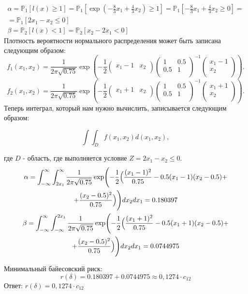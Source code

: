 \documentclass[14pt]{extarticle}
\begin{document}
\begin{gather*}
\alpha=\mathbb{P}_1\left[l\left(x\right) \geqslant 1\right]=\mathbb{P}_1\left[\exp \left(-\frac{8}{3}x_1+\frac{4}{3}x_2 \right) \geqslant 1\right]=\mathbb{P}_1\left[-\frac{8}{3}x_1+\frac{4}{3}x_2 \geqslant 0\right]=\\
=\mathbb{P}_1\left[2x_1 - x_2 \leqslant 0\right] \\
\beta=\mathbb{P}_2[l(x)<1]=\mathbb{P}_2[x_2-2x_1<0]
\end{gather*}
Плотность вероятности нормального распределения может быть записана следующим образом:
$$
f_1(x_1, x_2) = \frac{1}{2\pi\sqrt{0.75}} \exp{\left(-\frac{1}{2}\left(\begin{array}{cc}x_1 - 1 & x_2\\ \end{array}\right)\left(\begin{array}{cc}1 & 0.5\\ 0.5 & 1\\ \end{array}\right)^{-1}\left(\begin{array}{c}x_1 - 1\\ x_2\\ \end{array}\right)\right)}.
$$
$$
f_2(x_1, x_2) = \frac{1}{2\pi\sqrt{0.75}} \exp{\left(-\frac{1}{2}\left(\begin{array}{cc}x_1 + 1 & x_2\\ \end{array}\right)\left(\begin{array}{cc}1 & 0.5\\ 0.5 & 1\\ \end{array}\right)^{-1}\left(\begin{array}{c}x_1 + 1\\ x_2\\ \end{array}\right)\right)}.
$$
Теперь интеграл, который нам нужно вычислить, записывается следующим образом:

$$\int\int_D f(x_1, x_2) d(x_1, x_2),$$

где $D$ - область, где выполняется условие $Z = 2x_1 - x_2 \leq 0$.
\begin{gather*}
\alpha=\int_{-\infty}^{\infty} \int_{2x_1}^{\infty} \frac{1}{2\pi \sqrt{0.75}} \exp\Biggl(-\frac{1}{2} \Bigl( \frac{(x_1 - 1)^2}{0.75} - 0.5(x_1 - 1)(x_2 - 0.5) +\\+ \frac{(x_2 - 0.5)^2}{0.75} \Bigr) \Biggr) dx_2 dx_1= 0.180397 \\
\beta=\int_{-\infty}^{\infty} \int_{-\infty}^{2x_1} \frac{1}{2\pi \sqrt{0.75}} \exp\Biggl(-\frac{1}{2} \Bigl( \frac{(x_1 + 1)^2}{0.75} - 0.5(x_1 + 1)(x_2 - 0.5) +\\+ \frac{(x_2 - 0.5)^2}{0.75} \Bigr) \Biggr) dx_2 dx_1= 0.0744975
\end{gather*}

Минимальный байесовский риск:
$$
r(\delta)= 0.180397 + 0.0744975 \approx 0,1274 \cdot c_{12} 
$$
Ответ: $r(\delta)= 0,1274 \cdot c_{12} $
\end{document}
